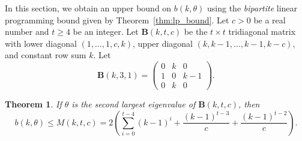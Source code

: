 \documentclass[10pt]{amsart}
\newtheorem{theo}{Theorem}[section]
\begin{document}
In this section, we obtain an upper bound on $b(k,\theta)$ using the {\em bipartite} linear programming bound given by Theorem~\ref{thm:lp_bound}. Let $c>0$ be a real number and $t\geq 4$ be an integer. Let $\boldsymbol{B}(k,t,c)$ be the $t \times t$ tridiagonal 
matrix 
with lower diagonal $(1,\ldots,1,c,k)$, upper diagonal $(k,k-1,\ldots, k-1,k-c)$, and constant row sum $k$. 
Let
\[
\boldsymbol{B}(k,3,1)=\begin{pmatrix}
0&k&0 \\
1&0&k-1 \\
0&k& 0
\end{pmatrix}.
\]


\begin{theo} \label{bound}
If $\theta$ is the second largest eigenvalue of $\boldsymbol{B}(k,t,c)$, then
\[
b(k,\theta) \leq M(k,t,c)=2\left(\sum_{i=0}^{t-4} (k-1)^{i}+ \frac{(k-1)^{t-3}}{c}+\frac{(k-1)^{t-2}}{c}\right). 
\] 
\end{theo} 
\end{document}
